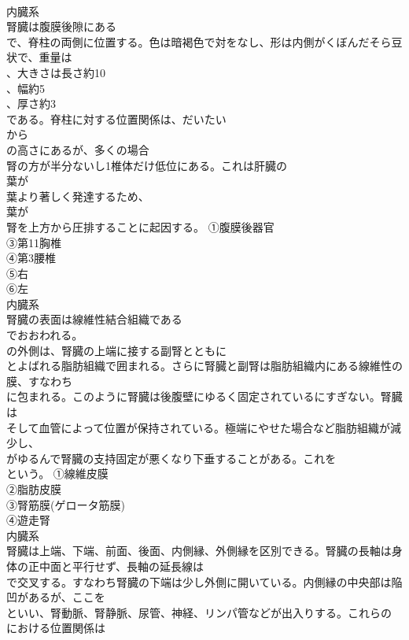 \documentclass[8pt]{extreport}
\begin{document}
\begin{CJK}{UTF8}{min}
\\	内臓系
\\	腎臓は腹膜後隙にある
\\	で、脊柱の両側に位置する。色は暗褐色で対をなし、形は内側がくぼんだそら豆状で、重量は
\\	、大きさは長さ約10
\\	、幅約5
\\	、厚さ約3
\\	である。脊柱に対する位置関係は、だいたい
\\	から
\\	の高さにあるが、多くの場合
\\	腎の方が半分ないし1椎体だけ低位にある。これは肝臓の
\\	葉が
\\	葉より著しく発達するため、
\\	葉が
\\	腎を上方から圧排することに起因する。	①腹膜後器官
\\	③第11胸椎
\\	④第3腰椎
\\	⑤右
\\	⑥左
\\	内臓系
\\	腎臓の表面は線維性結合組織である
\\	でおおわれる。
\\	の外側は、腎臓の上端に接する副腎とともに
\\	とよばれる脂肪組織で囲まれる。さらに腎臓と副腎は脂肪組織内にある線維性の膜、すなわち
\\	に包まれる。このように腎臓は後腹壁にゆるく固定されているにすぎない。腎臓は
\\	そして血管によって位置が保持されている。極端にやせた場合など脂肪組織が減少し、
\\	がゆるんで腎臓の支持固定が悪くなり下垂することがある。これを
\\	という。	①線維皮膜
\\	②脂肪皮膜
\\	③腎筋膜(ゲロータ筋膜)
\\	④遊走腎
\\	内臓系
\\	腎臓は上端、下端、前面、後面、内側縁、外側縁を区別できる。腎臓の長軸は身体の正中面と平行せず、長軸の延長線は
\\	で交叉する。すなわち腎臓の下端は少し外側に開いている。内側縁の中央部は陥凹があるが、ここを
\\	といい、腎動脈、腎静脈、尿管、神経、リンパ管などが出入りする。これらの
\\	における位置関係は

\end{CJK}
\end{document}
